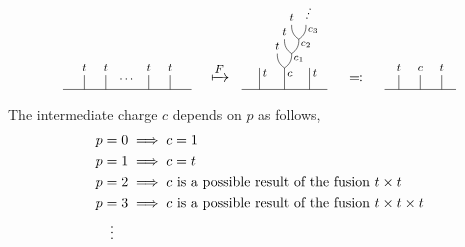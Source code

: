 \documentclass[a4paper,10pt,oneside]{book}
\theoremstyle{plain}
\theoremstyle{definition}
\theoremstyle{remark}
\begin{document}
\begin{equation}\label{eq:F U_p basis}
  \begin{tikzpicture}[scale=0.18,font=\footnotesize,anchor=mid]
    \draw (-27, -1) to (-27, -3); %
    \node at (-27, 0) {$t$};
    \draw (-24, -1) to (-24, -3); %
    \node at (-24, 0) {$t$};
    \node at (-21, -1.5) {$\cdots$};
    \draw (-18, -1) to (-18, -3); %
    \node at (-18, 0) {$t$};
    \draw (-15, -1) to (-15, -3); %
    \node at (-15, 0) {$t$};
    \draw (-30, -3) to (-12, -3); %
    \node[font=\large] at (-8, -1.5) {$\xmapsto{F}$};
    \draw (2, 6) to [bend left=-30] (3, 4);
    \draw (4, 6) to [bend left=30]  (3, 4);
    \draw (1, 4) to [bend left=-30] (2, 2);
    \draw (3, 4) to [bend left=30]  (2, 2);
    \draw (0, 2) to [bend left=-30] (1, 0);
    \draw (2, 2) to [bend left=30]  (1, 0);
    \draw (1, 0) to (1, -3); %
    \node at (1+0.75, -0.75) {$c$};
    \node[font=\scriptsize] at (3, 1.5) {$c_1$};
    \node[font=\scriptsize] at (4, 3.5) {$c_2$};
    \node[font=\scriptsize] at (5, 5.5) {$c_3$};
    \node at (0, 2+1) {$t$};
    \node at (1, 4+1) {$t$};
    \node at (2, 6+1) {$t$};
    \node[rotate=-20] at (4.25, 6+1.25) {$\vdots$};
    \draw (-5, -3) to (7, -3); %
    \draw (-2.5, 0) to (-2.5, -3); %
    \draw (4.5, 0) to (4.5, -3); %
    \node at (-2.5+0.75, -0.75) {$t$};
    \node at (4.5+0.75, -0.75) {$t$};
    \node[font=\normalsize] at (11, -1.5) {$\eqqcolon$};
    \draw (17, -1) to (17, -3); %
    \draw (20, -1) to (20, -3); %
    \draw (23, -1) to (23, -3); %
    \node at (17, 0) {$t$};
    \node at (20, 0) {$c$};
    \node at (23, 0) {$t$};
    \draw (15, -3) to (25, -3); %
  \end{tikzpicture}
\end{equation}
The intermediate charge $c$ depends on $p$ as follows,
\begin{align*}
  p &= 0 \implies c = 1 \\
  p &= 1 \implies c = t \\
  p &= 2 \implies c \text{ is a possible result of the fusion } t \times t \\
  p &= 3 \implies c \text{ is a possible result of the fusion } t \times t \times t \\
  & \vdotswithin{=}
\end{align*}
\end{document}
